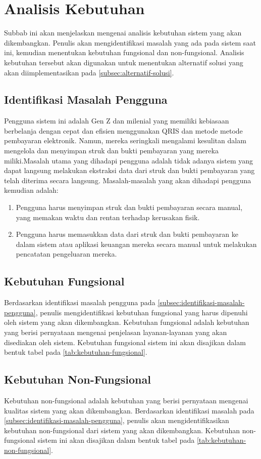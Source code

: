 \section{Analisis Kebutuhan}
\label{sec:analisis-kebutuhan}

Subbab ini akan menjelaskan mengenai analisis kebutuhan sistem yang akan dikembangkan. Penulis akan mengidentifikasi masalah yang ada pada sistem saat ini, kemudian menentukan kebutuhan fungsional dan non-fungsional. Analisis kebutuhan tersebut akan digunakan untuk menentukan alternatif solusi yang akan diimplementasikan pada \autoref{subsec:alternatif-solusi}.

\subsection{Identifikasi Masalah Pengguna}
\label{subsec:identifikasi-masalah-pengguna}
Pengguna sistem ini adalah Gen Z dan milenial yang memiliki kebiasaan berbelanja dengan cepat dan efisien menggunakan QRIS dan metode metode pembayaran elektronik. Namun, mereka seringkali mengalami kesulitan dalam mengelola dan menyimpan struk dan bukti pembayaran yang mereka miliki.Masalah utama yang dihadapi pengguna adalah tidak adanya sistem yang dapat langsung melakukan ekstraksi data dari struk dan bukti pembayaran yang telah diterima secara langsung. Masalah-masalah yang akan dihadapi pengguna kemudian adalah:
\begin{enumerate}
    \item Pengguna harus menyimpan struk dan bukti pembayaran secara manual, yang memakan waktu dan rentan terhadap kerusakan fisik.
    \item Pengguna harus memasukkan data dari struk dan bukti pembayaran ke dalam sistem atau aplikasi keuangan mereka secara manual untuk melakukan pencatatan pengeluaran mereka.
\end{enumerate}

\subsection{Kebutuhan Fungsional}
\label{subsec:kebutuhan-fungsional}
Berdasarkan identifikasi masalah pengguna pada \autoref{subsec:identifikasi-masalah-pengguna}, penulis mengidentifikasi kebutuhan fungsional yang harus dipenuhi oleh sistem yang akan dikembangkan. Kebutuhan fungsional adalah kebutuhan yang berisi pernyataan mengenai 
penjelasan layanan-layanan yang akan disediakan oleh sistem. Kebutuhan fungsional sistem ini akan disajikan dalam bentuk tabel pada \autoref{tab:kebutuhan-fungsional}.

\subsection{Kebutuhan Non-Fungsional}
\label{subsec:kebutuhan-non-fungsional}
Kebutuhan non-fungsional adalah kebutuhan yang berisi pernyataan mengenai kualitas sistem yang akan dikembangkan. Berdasarkan identifikasi masalah pada \autoref{subsec:identifikasi-masalah-pengguna}, penulis akan mengidentifikasikan kebutuhan non-fungsional dari sistem yang akan dikembangkan. Kebutuhan non-fungsional sistem ini akan disajikan dalam bentuk tabel pada \autoref{tab:kebutuhan-non-fungsional}.